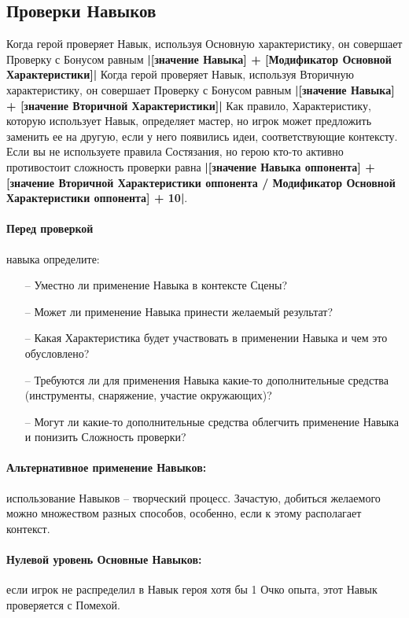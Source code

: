 \subsection{Проверки Навыков}
Когда герой проверяет Навык, используя Основную характеристику, он совершает Проверку с Бонусом равным \textbf{|[значение Навыка] + [Модификатор Основной Характеристики]|}
\newline Когда герой проверяет Навык, используя Вторичную характеристику, он совершает Проверку с Бонусом равным \textbf{|[значение Навыка] + [значение Вторичной Характеристики]|}
\newline Как правило, Характеристику, которую использует Навык, определяет мастер, но игрок может предложить заменить ее на другую, если у него появились идеи, соответствующие контексту.
\newline Если вы не используете правила Состязания, но герою кто-то активно противостоит сложность проверки равна \textbf{|[значение Навыка оппонента] + [значение Вторичной Характеристики оппонента / Модификатор Основной Характеристики оппонента] + 10|}.

\paragraph{Перед проверкой} навыка определите:
\begin{itemize}
    \item[--] Уместно ли применение Навыка в контексте Сцены?
    \item[--] Может ли применение Навыка принести желаемый результат?
    \item[--] Какая Характеристика будет участвовать в применении Навыка и чем это обусловлено?
    \item[--] Требуются ли для применения Навыка какие-то дополнительные средства (инструменты, снаряжение, участие окружающих)?
    \item[--] Могут ли какие-то дополнительные средства облегчить применение Навыка и понизить Сложность проверки?
\end{itemize}

\paragraph{Альтернативное применение Навыков:} использование Навыков – творческий процесс. Зачастую, добиться желаемого можно множеством разных способов, особенно, если к этому располагает контекст. 

\paragraph{Нулевой уровень Основные Навыков:} если игрок не распределил в Навык героя хотя бы 1 Очко опыта, этот Навык проверяется с Помехой.
